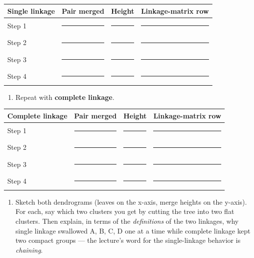 \documentclass[
  11pt,
]{article}
\newcounter{none} %
\providecommand{\tightlist}{%
  \setlength{\itemsep}{0pt}\setlength{\parskip}{0pt}}
\newcommand{\answerspace}[1]{\par\vspace*{#1}}  %
\newcommand{\blank}[1][1.2in]{\rule{#1}{0.4pt}}
\begin{document}
{\def\LTcaptype{none} %
\begin{longtable}[]{@{}llll@{}}
\toprule\noalign{}
Single linkage & Pair merged & Height & Linkage-matrix row \\
\midrule\noalign{}
\endhead
\bottomrule\noalign{}
\endlastfoot
Step 1 & \blank[1.2in] & \blank[0.7in] & \blank[2in] \\
Step 2 & \blank[1.2in] & \blank[0.7in] & \blank[2in] \\
Step 3 & \blank[1.2in] & \blank[0.7in] & \blank[2in] \\
Step 4 & \blank[1.2in] & \blank[0.7in] & \blank[2in] \\
\end{longtable}
}

\answerspace{4in}

\begin{enumerate}
\def\labelenumi{(\alph{enumi})}
\setcounter{enumi}{1}
\tightlist
\item
  Repeat with \textbf{complete linkage}.
\end{enumerate}

{\def\LTcaptype{none} %
\begin{longtable}[]{@{}llll@{}}
\toprule\noalign{}
Complete linkage & Pair merged & Height & Linkage-matrix row \\
\midrule\noalign{}
\endhead
\bottomrule\noalign{}
\endlastfoot
Step 1 & \blank[1.2in] & \blank[0.7in] & \blank[2in] \\
Step 2 & \blank[1.2in] & \blank[0.7in] & \blank[2in] \\
Step 3 & \blank[1.2in] & \blank[0.7in] & \blank[2in] \\
Step 4 & \blank[1.2in] & \blank[0.7in] & \blank[2in] \\
\end{longtable}
}

\answerspace{3.2in}

\begin{enumerate}
\def\labelenumi{(\alph{enumi})}
\setcounter{enumi}{2}
\tightlist
\item
  Sketch both dendrograms (leaves on the x-axis, merge heights on the
  y-axis). For each, say which two clusters you get by cutting the tree
  into two flat clusters. Then explain, in terms of the
  \emph{definitions} of the two linkages, why single linkage swallowed
  A, B, C, D one at a time while complete linkage kept two compact
  groups --- the lecture's word for the single-linkage behavior is
  \emph{chaining}.
\end{enumerate}
\end{document}
